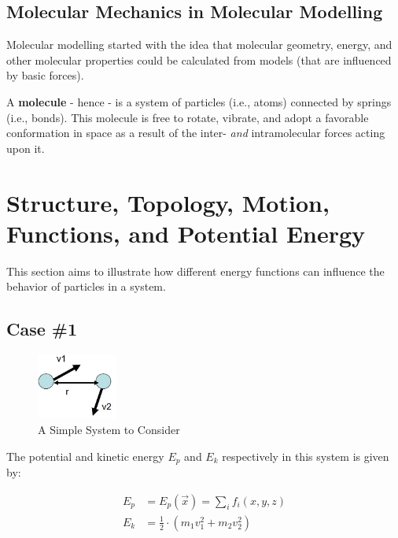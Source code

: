 \documentclass[
  letterpaper,
  DIV=11,
  numbers=noendperiod]{scrreprt}
\begin{document}
\hypertarget{molecular-mechanics-in-molecular-modelling}{%
\subsection{Molecular Mechanics in Molecular
Modelling}\label{molecular-mechanics-in-molecular-modelling}}

Molecular modelling started with the idea that molecular geometry,
energy, and other molecular properties could be calculated from models
(that are influenced by basic forces).

A \textbf{molecule} - hence - is a system of particles (i.e., atoms)
connected by springs (i.e., bonds). This molecule is free to rotate,
vibrate, and adopt a favorable conformation in space as a result of the
inter- \emph{and} intramolecular forces acting upon it.

\hypertarget{structure-topology-motion-functions-and-potential-energy}{%
\section{Structure, Topology, Motion, Functions, and Potential
Energy}\label{structure-topology-motion-functions-and-potential-energy}}

This section aims to illustrate how different energy functions can
influence the behavior of particles in a system.

\hypertarget{case-1}{%
\subsection{Case \#1}\label{case-1}}

\begin{figure}

{\centering \includegraphics[width=1.04in,height=\textheight]{./images/wk1/system.jpg}

}

\caption{A Simple System to Consider}

\end{figure}

The potential and kinetic energy \(E_p\) and \(E_k\) respectively in
this system is given by:

\begin{align}
  E_p &= E_p(\vec{x}) = \sum_{i}f_i(x, y, z) \\ 
  E_k &= \frac{1}{2} \cdot (m_1v_1^2 + m_2v_2^2) 
\end{align}
\end{document}
